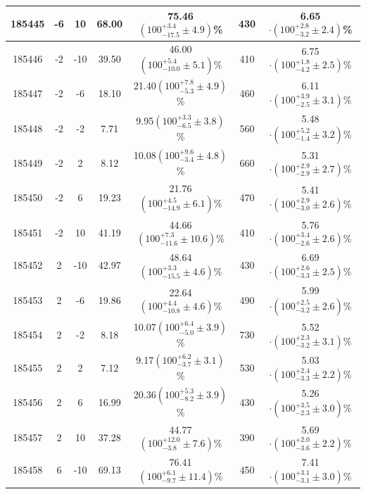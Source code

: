 \begin{table}[ht!]
{\begin{tabular}{c|c|c|c|c|c|c}
185445 &  -6   &  10  &  68.00      &    75.46$(100^{+3.4}_{-17.5}\pm 4.9 )$\%   &     430     &           6.65$\cdot (100^{+2.8}_{-3.2}\pm 2.4 )$\%\\
\hline
185446 & -2    &  -10 &  39.50    &    46.00$(100^{+5.4}_{-10.0}\pm 5.1 )$\%      &    410     &           6.75$\cdot (100^{+1.8}_{-4.2}\pm 2.5)$\% \\
185447 & -2    &  -6  &  18.10    &    21.40$(100^{+7.8}_{-5.3}\pm 4.9 )$\%    &      460     &           6.11$\cdot (100^{+3.9}_{-2.5}\pm 3.1 )$\% \\
185448 & -2    &  -2  &  7.71    &    9.95$(100^{+3.3}_{-6.5}\pm 3.8 )$\%    &        560     &           5.48$\cdot (100^{+5.2}_{-1.4}\pm 3.2 )$\% \\
185449 & -2    &  2   &  8.12    &    10.08$(100^{+9.6}_{-3.4}\pm 4.8 )$\%   &        660     &           5.31$\cdot (100^{+2.9}_{-2.9}\pm  2.7)$\% \\
185450 & -2    &  6   &  19.23   &    21.76$(100^{+4.5}_{-14.9}\pm 6.1 )$\%   &        470     &           5.41$\cdot (100^{+2.9}_{-3.0}\pm 2.6 )$\% \\
185451 & -2    &  10  &  41.19   &    44.66$(100^{+7.3}_{-11.6}\pm  10.6)$\%   &        410     &           5.76$\cdot (100^{+3.4}_{-2.6}\pm 2.6 )$\% \\
\hline
185452 & 2     &  -10 &  42.97   &    48.64$(100^{+3.3}_{-15.5}\pm  4.6)$\%   &        430     &           6.69$\cdot (100^{+2.6}_{-3.3}\pm 2.5  )$\% \\
185453 & 2     &  -6  &  19.86   &    22.64$(100^{+4.4}_{-10.8}\pm 4.6 )$\%   &        490     &           5.99$\cdot (100^{+2.5}_{-3.2}\pm 2.6 )$\% \\ 
185454 & 2     &  -2  &  8.18    &    10.07$(100^{+6.4}_{-5.0}\pm  3.9)$\%   &        730     &           5.52$\cdot (100^{+2.3}_{-3.2}\pm 3.1)$\% \\
185455 & 2     &  2   &  7.12    &    9.17$(100^{+6.2}_{-3.7}\pm 3.1 )$\%    &        530     &           5.03$\cdot (100^{+2.4}_{-3.3}\pm 2.2)$\% \\
185456 & 2     &  6   &  16.99   &    20.36$(100^{+5.3}_{-8.2}\pm 3.9 )$\%   &        430     &           5.26$\cdot (100^{+3.5}_{-2.3}\pm 3.0)$\% \\
185457 & 2     &  10  &  37.28   &    44.77$(100^{+12.0}_{-3.8}\pm 7.6  )$\%   &        390     &           5.69$\cdot (100^{+2.0}_{-3.6}\pm 2.2 )$\% \\ 
\hline
185458 &  6    &  -10 &  69.13   &    76.41$(100^{+6.1}_{-9.7}\pm 11.4 )$\%   &        450     &           7.41$\cdot (100^{+3.1}_{-3.1}\pm 3.0 )$\% \\

\end{tabular}}
\end{table}
